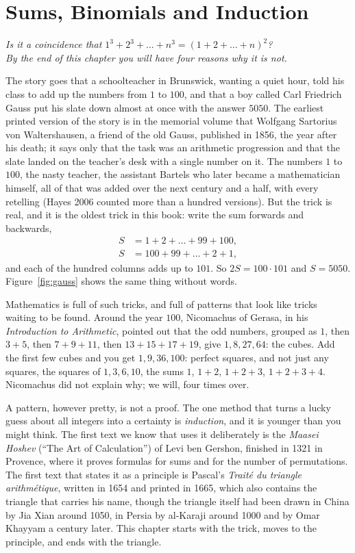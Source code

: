 \chapter{Sums, Binomials and Induction}

\begin{center}\itshape
Is it a coincidence that $1^3+2^3+\dots+n^3=(1+2+\dots+n)^2$?\\
By the end of this chapter you will have four reasons why it is not.
\end{center}

The story goes that a schoolteacher in Brunswick, wanting a quiet hour, told his class to add up the numbers from $1$ to $100$, and that a
boy called Carl Friedrich Gauss put his slate down almost at once with the answer $5050$. The earliest printed version of the story is in the
memorial volume that Wolfgang Sartorius von Waltershausen, a friend of the old Gauss, published in 1856, the year after his death; it says only that
the task was an arithmetic progression and that the slate landed on the teacher's desk with a single number on it. The numbers $1$ to $100$, the
nasty teacher, the assistant Bartels who later became a mathematician himself, all of that was added over the next century and a half, with every
retelling (Hayes 2006 counted more than a hundred versions). But the trick is real, and it is the oldest trick in this book: write the sum forwards and
backwards,
\[
\begin{aligned}
S&=1+2+\dots+99+100,\\
S&=100+99+\dots+2+1,
\end{aligned}
\]
and each of the hundred columns adds up to $101$. So $2S=100\cdot101$ and $S=5050$. Figure~\ref{fig:gauss} shows the same thing without words.

Mathematics is full of such tricks, and full of patterns that look like tricks waiting to be found. Around the year $100$, Nicomachus of Gerasa, in his
\emph{Introduction to Arithmetic}, pointed out that the odd numbers, grouped as $1$, then $3+5$, then $7+9+11$, then $13+15+17+19$, give $1,8,27,64$: the
cubes. Add the first few cubes and you get $1,9,36,100$: perfect squares, and not just any squares, the squares of $1,3,6,10$, the sums $1$, $1+2$,
$1+2+3$, $1+2+3+4$. Nicomachus did not explain why; we will, four times over.

A pattern, however pretty, is not a proof. The one method that turns a lucky guess about all integers into a certainty is \emph{induction}, and it is
younger than you might think. The first text we know that uses it deliberately is the \emph{Maasei Hoshev} (``The Art of Calculation'') of Levi ben
Gershon, finished in 1321 in Provence, where it proves formulas for sums and for the number of permutations. The first text that states it as a
principle is Pascal's \emph{Trait\'e du triangle arithm\'etique}, written in 1654 and printed in 1665, which also contains the triangle that carries
his name, though the triangle itself had been drawn in China by Jia Xian around 1050, in Persia by al-Karaji around 1000 and by Omar Khayyam a century
later. This chapter starts with the trick, moves to the principle, and ends with the triangle.

